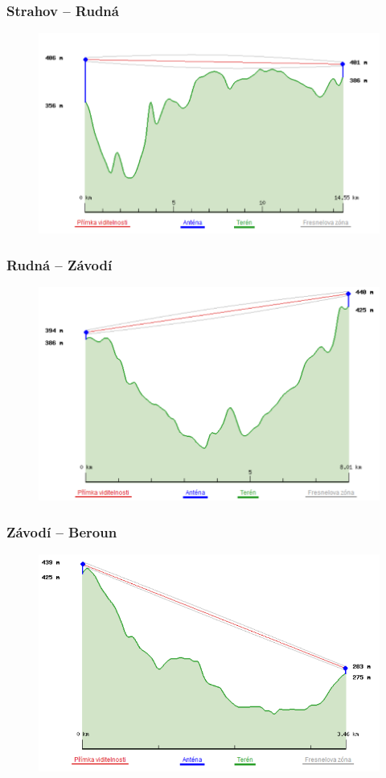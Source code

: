 \documentclass[aspectratio=169, 12pt, hyperref={unicode}]{beamer}
\begin{document}
\begin{frame}
\frametitle{Strahov -- Rudná}
\begin{figure}[!ht]
	\begin{center}
		\includegraphics[width=.7\textwidth]{src/strahov-rudna.png}
	\end{center}
\end{figure}
\end{frame}

\begin{frame}
\frametitle{Rudná -- Závodí}
\begin{figure}[!ht]
	\begin{center}
		\includegraphics[width=.7\textwidth]{src/rudna-zavodi.png}
	\end{center}
\end{figure}
\end{frame}

\begin{frame}
\frametitle{Závodí -- Beroun}
\begin{figure}[!ht]
	\begin{center}
		\includegraphics[width=.7\textwidth]{src/zavodi-beroun.png}
	\end{center}
\end{figure}
\end{frame}
\end{document}
